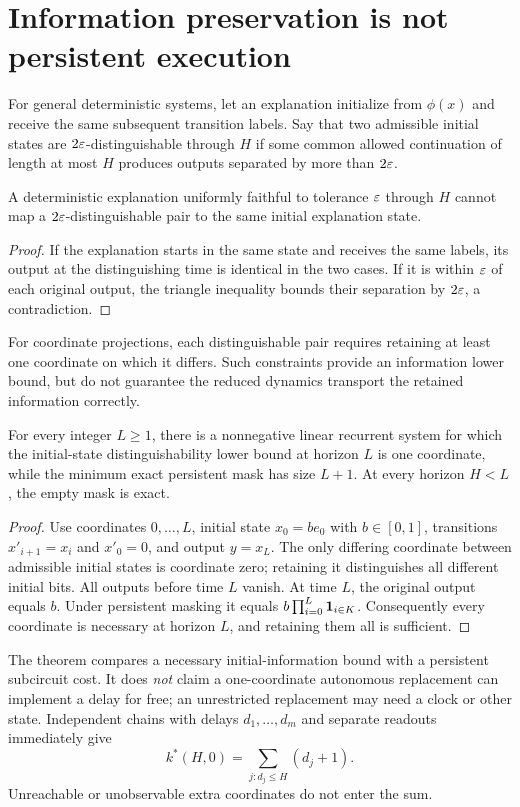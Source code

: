 \section{Information preservation is not persistent execution}
For general deterministic systems, let an explanation initialize from $\phi(x)$ and receive the same subsequent transition labels. Say that two admissible initial states are $2\varepsilon$-distinguishable through $H$ if some common allowed continuation of length at most $H$ produces outputs separated by more than $2\varepsilon$.

\begin{proposition}\label{prop:information}
A deterministic explanation uniformly faithful to tolerance $\varepsilon$ through $H$ cannot map a $2\varepsilon$-distinguishable pair to the same initial explanation state.
\end{proposition}
\begin{proof}
If the explanation starts in the same state and receives the same labels, its output at the distinguishing time is identical in the two cases. If it is within $\varepsilon$ of each original output, the triangle inequality bounds their separation by $2\varepsilon$, a contradiction.
\end{proof}
For coordinate projections, each distinguishable pair requires retaining at least one coordinate on which it differs. Such constraints provide an information lower bound, but do not guarantee the reduced dynamics transport the retained information correctly.

\begin{theorem}\label{thm:relay}
For every integer $L\ge1$, there is a nonnegative linear recurrent system for which the initial-state distinguishability lower bound at horizon $L$ is one coordinate, while the minimum exact persistent mask has size $L+1$. At every horizon $H<L$, the empty mask is exact.
\end{theorem}
\begin{proof}
Use coordinates $0,\ldots,L$, initial state $x_0=b e_0$ with $b\in[0,1]$, transitions $x'_{i+1}=x_i$ and $x'_0=0$, and output $y=x_L$. The only differing coordinate between admissible initial states is coordinate zero; retaining it distinguishes all different initial bits. All outputs before time $L$ vanish. At time $L$, the original output equals $b$. Under persistent masking it equals $b\prod_{i=0}^L\mathbf 1_{i\in K}$. Consequently every coordinate is necessary at horizon $L$, and retaining them all is sufficient.
\end{proof}
The theorem compares a necessary initial-information bound with a persistent subcircuit cost. It does \emph{not} claim a one-coordinate autonomous replacement can implement a delay for free; an unrestricted replacement may need a clock or other state. Independent chains with delays $d_1,\ldots,d_m$ and separate readouts immediately give
\begin{equation}
 k^*(H,0)=\sum_{j:d_j\le H}(d_j+1).
 \label{eq:chains}
\end{equation}
Unreachable or unobservable extra coordinates do not enter the sum.


